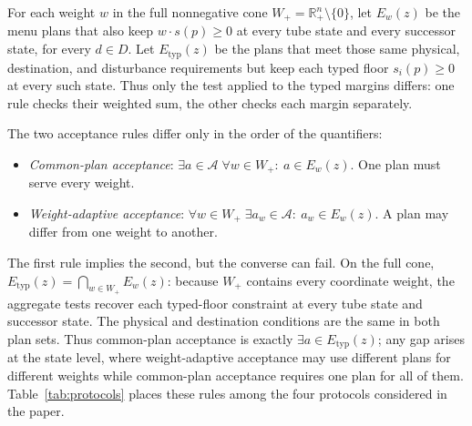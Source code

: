 \documentclass[preprint,11pt,authoryear]{elsarticle}
\theoremstyle{definition}
\theoremstyle{remark}
\newcommand{\Etyp}{E_{\mathrm{typ}}}
\newcommand{\Wp}{W_+}
\newcommand{\Rp}{\mathbb{R}^n_+}
\begin{document}
\begin{samepage}
For each weight $w$ in the full nonnegative cone $\Wp=\Rp\setminus\{0\}$, let $E_w(z)$ be the menu plans that also keep $w\cdot s(p)\ge0$ at every tube state and every successor state, for every $d\in D$. Let $\Etyp(z)$ be the plans that meet those same physical, destination, and disturbance requirements but keep each typed floor $s_i(p)\ge0$ at every such state. Thus only the test applied to the typed margins differs: one rule checks their weighted sum, the other checks each margin separately.
\end{samepage}

The two acceptance rules differ only in the order of the quantifiers:
\begin{itemize}[leftmargin=2em]
\item \emph{Common-plan acceptance}: $\exists a\in\mathcal A\;\forall w\in\Wp:\ a\in E_w(z)$. One plan must serve every weight.
\item \emph{Weight-adaptive acceptance}: $\forall w\in\Wp\;\exists a_w\in\mathcal A:\ a_w\in E_w(z)$. A plan may differ from one weight to another.
\end{itemize}
The first rule implies the second, but the converse can fail. On the full cone, $\Etyp(z)=\bigcap_{w\in\Wp}E_w(z)$: because $\Wp$ contains every coordinate weight, the aggregate tests recover each typed-floor constraint at every tube state and successor state. The physical and destination conditions are the same in both plan sets. Thus common-plan acceptance is exactly $\exists a\in\Etyp(z)$; any gap arises at the state level, where weight-adaptive acceptance may use different plans for different weights while common-plan acceptance requires one plan for all of them. Table~\ref{tab:protocols} places these rules among the four protocols considered in the paper.
\end{document}
